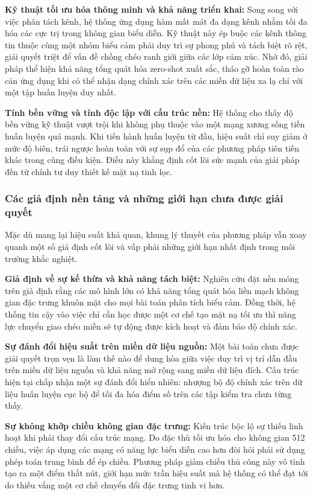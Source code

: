 \textbf{Kỹ thuật tối ưu hóa thông minh và khả năng triển khai:} 
Song song với việc phân tách kênh, hệ thống ứng dụng hàm mất mát đa dạng kênh nhằm tối đa hóa các cực trị trong không gian biểu diễn. Kỹ thuật này ép buộc các kênh thông tin thuộc cùng một nhóm biểu cảm phải duy trì sự phong phú và tách biệt rõ rệt, giải quyết triệt để vấn đề chồng chéo ranh giới giữa các lớp cảm xúc. Nhờ đó, giải pháp thể hiện khả năng tổng quát hóa zero-shot xuất sắc, tháo gỡ hoàn toàn rào cản ứng dụng khi có thể nhận dạng chính xác trên các miền dữ liệu xa lạ chỉ với một tập huấn luyện duy nhất.

\textbf{Tính bền vững và tính độc lập với cấu trúc nền:} 
Hệ thống cho thấy độ bền vững kỹ thuật vượt trội khi không phụ thuộc vào một mạng xương sống tiền huấn luyện quá mạnh. Khi tiến hành huấn luyện từ đầu, hiệu suất chỉ suy giảm ở mức độ biên, trái ngược hoàn toàn với sự sụp đổ của các phương pháp tiên tiến khác trong cùng điều kiện. Điều này khẳng định cốt lõi sức mạnh của giải pháp đến từ chính tư duy thiết kế mặt nạ tinh lọc.

\subsubsection{Các giả định nền tảng và những giới hạn chưa được giải quyết}

Mặc dù mang lại hiệu suất khả quan, khung lý thuyết của phương pháp vẫn xoay quanh một số giả định cốt lõi và vấp phải những giới hạn nhất định trong môi trường khắc nghiệt.

\textbf{Giả định về sự kế thừa và khả năng tách biệt:} 
Nghiên cứu đặt nền móng trên giả định rằng các mô hình lớn có khả năng tổng quát hóa liền mạch không gian đặc trưng khuôn mặt cho mọi bài toán phân tích biểu cảm. Đồng thời, hệ thống tin cậy vào việc chỉ cần học được một cơ chế tạo mặt nạ tối ưu thì năng lực chuyển giao chéo miền sẽ tự động được kích hoạt và đảm bảo độ chính xác.

\textbf{Sự đánh đổi hiệu suất trên miền dữ liệu nguồn:} 
Một bài toán chưa được giải quyết trọn vẹn là làm thế nào để dung hòa giữa việc duy trì vị trí dẫn đầu trên miền dữ liệu nguồn và khả năng mở rộng sang miền dữ liệu đích. Cấu trúc hiện tại chấp nhận một sự đánh đổi hiển nhiên: nhượng bộ độ chính xác trên dữ liệu huấn luyện cục bộ để tối đa hóa điểm số trên các tập kiểm tra chưa từng thấy.

\textbf{Sự không khớp chiều không gian đặc trưng:} 
Kiến trúc bộc lộ sự thiếu linh hoạt khi phải thay đổi cấu trúc mạng. Do đặc thù tối ưu hóa cho không gian 512 chiều, việc áp dụng các mạng có năng lực biểu diễn cao hơn đòi hỏi phải sử dụng phép toán trung bình để ép chiều. Phương pháp giảm chiều thủ công này vô tình tạo ra một điểm thắt nút, giới hạn mức trần hiệu suất mà hệ thống có thể đạt tới do thiếu vắng một cơ chế chuyển đổi đặc trưng tinh vi hơn.

